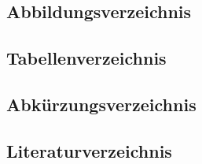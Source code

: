 \subsection{Abbildungsverzeichnis}
{%
\makeatletter
{}
\makeatother
}

\newpage
\subsection{Tabellenverzeichnis}
{%
\makeatletter
{}
\makeatother
}

\glsaddallunused%
\newpage
\subsection{Abkürzungsverzeichnis}
{%
\renewcommand*{\glossarysection}[2][]{}
\printnoidxglossary[type=\acronymtype, sort=letter]
}
\newpage
\subsection{Literaturverzeichnis}
\printbibliography[heading=none]
